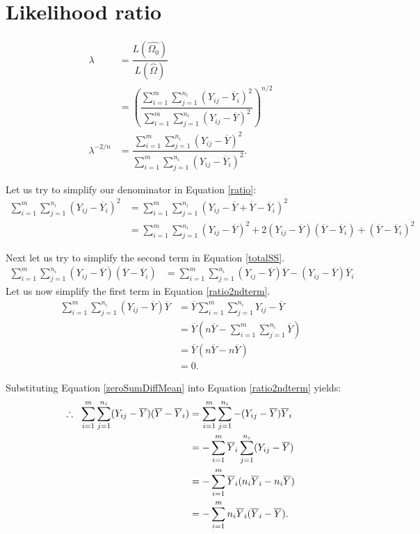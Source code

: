 \documentclass[12pt,a4paper,openright]{article}
\newcommand{\eqn}[1]{Equation \ref{#1}}
\newcommand{\ovY}{\overline{Y}}
\begin{document}
	\section{Likelihood ratio}
	\begin{align}
		\lambda &= \dfrac{L(\widehat{\Omega_0})}{L(\widehat{\Omega})} \nonumber\\
		&= \left(\dfrac{\sum_{i=1}^m \sum_{j=1}^{n_i} (Y_{ij}-\ovY_i)^2}{\sum_{i=1}^m \sum_{j=1}^{n_i} (Y_{ij}-\ovY)^2}\right)^{n/2} \nonumber \\
		\lambda^{-2/n} &= \dfrac{\sum_{i=1}^m \sum_{j=1}^{n_i} (Y_{ij}-\ovY)^2}{\sum_{i=1}^m \sum_{j=1}^{n_i} (Y_{ij}-\ovY_i)^2}.\label{ratio}
	\end{align}

	Let us try to simplify our denominator in \eqn{ratio}:
	\begin{align}
		\sum_{i=1}^m \sum_{j=1}^{n_i} (Y_{ij}-\ovY_i)^2 &= \sum_{i=1}^m \sum_{j=1}^{n_i} (Y_{ij}-\ovY+\ovY - \ovY_i)^2 \nonumber\\
		&= \sum_{i=1}^m \sum_{j=1}^{n_i} (Y_{ij}-\ovY)^2 + 2(Y_{ij}-\ovY)(\ovY - \ovY_i) + (\ovY-\ovY_i)^2 \label{totalSS}
	\end{align}

	Next let us try to simplify the second term in \eqn{totalSS}.
	\begin{align}
		\sum_{i=1}^m \sum_{j=1}^{n_i} (Y_{ij}-\ovY)(\ovY - \ovY_i) &= \sum_{i=1}^m \sum_{j=1}^{n_i} (Y_{ij}-\ovY)\ovY - (Y_{ij}-\ovY)\ovY_i \label{ratio2ndterm}
	\end{align}
	Let us now simplify the first term in \eqn{ratio2ndterm}.
	\begin{align}
		\sum_{i=1}^m \sum_{j=1}^{n_i} (Y_{ij}-\ovY)\ovY &= \ovY \sum_{i=1}^m \sum_{j=1}^{n_i} Y_{ij}-\ovY \nonumber \\
		&= \ovY (n\ovY - \sum_{i=1}^m \sum_{j=1}^{n_i} \ovY) \nonumber \\
		&= \ovY(n\ovY - n\ovY) \nonumber \\
		&= 0. \label{zeroSumDiffMean}
	\end{align}

	Substituting \eqn{zeroSumDiffMean} into \eqn{ratio2ndterm} yields:
	\begin{align}
		\therefore \hspace{0.2cm} \sum_{i=1}^m \sum_{j=1}^{n_i} (Y_{ij}-\ovY)(\ovY - \ovY_i) &= \sum_{i=1}^m \sum_{j=1}^{n_i} - (Y_{ij}-\ovY)\ovY_i \nonumber \\
		&= -\sum_{i=1}^m \ovY_i \sum_{j=1}^{n_i} (Y_{ij}-\ovY) \nonumber \\ 
		&= -\sum_{i=1}^m \ovY_i (n_i \ovY_i - n_i \ovY) \nonumber \\
		&= -\sum_{i=1}^m n_i \ovY_i (\ovY_i - \ovY).\label{final}
	\end{align}
\end{document}
